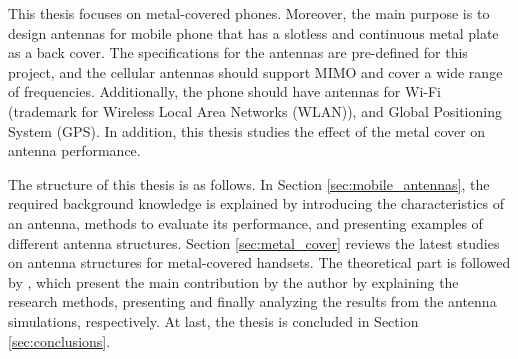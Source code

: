 This thesis focuses on metal-covered phones. Moreover, the main purpose is to design antennas for mobile phone that has a slotless and continuous metal plate as a back cover. The specifications for the antennas are pre-defined for this project, and the cellular antennas should support MIMO and cover a wide range of frequencies. Additionally, the phone should have antennas for Wi-Fi (trademark for Wireless Local Area Networks (WLAN)), and Global Positioning System (GPS). In addition, this thesis studies the effect of the metal cover on antenna performance.

The structure of this thesis is as follows. In Section \ref{sec:mobile_antennas}, the required background knowledge is explained by introducing the characteristics of an antenna, methods to evaluate its performance, and presenting examples of different antenna structures. Section \ref{sec:metal_cover} reviews the latest studies on antenna structures for metal-covered handsets. The theoretical part is followed by , which present the main contribution by the author by explaining the research methods, presenting and finally analyzing the results from the antenna simulations, respectively. At last, the thesis is concluded in Section \ref{sec:conclusions}.

\clearpage

